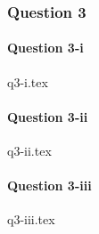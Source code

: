 \documentclass[crop=false,fleqn]{standalone}
\begin{document}
    \subsubsection{Question 3}
    
    \paragraph{Question 3-i}
    {q3-i.tex}

    \paragraph{Question 3-ii}
    {q3-ii.tex}

    \paragraph{Question 3-iii}
    {q3-iii.tex}
\end{document}
